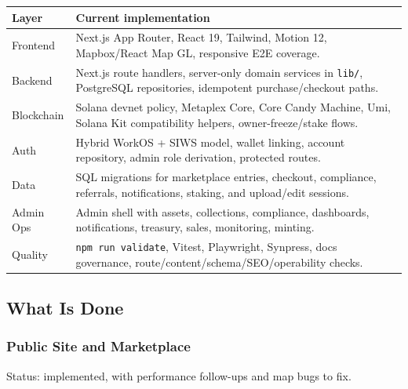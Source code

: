 \documentclass[
  10pt,
  letterpaper,
]{article}
\newcounter{none} %
\let\oldtexttt\texttt
\renewcommand{\texttt}[1]{\oldtexttt{\small #1}}
\begin{document}
{\def\LTcaptype{none} %
\begin{longtable}[]{@{}
  >{\raggedright\arraybackslash}p{}
  >{\raggedright\arraybackslash}p{}@{}}
\toprule\noalign{}
\begin{minipage}[b]{\linewidth}\raggedright
Layer
\end{minipage} & \begin{minipage}[b]{\linewidth}\raggedright
Current implementation
\end{minipage} \\
\midrule\noalign{}
\endhead
\bottomrule\noalign{}
\endlastfoot
Frontend & Next.js App Router, React 19, Tailwind, Motion 12,
Mapbox/React Map GL, responsive E2E coverage. \\
Backend & Next.js route handlers, server-only domain services in
\texttt{lib/}, PostgreSQL repositories, idempotent purchase/checkout
paths. \\
Blockchain & Solana devnet policy, Metaplex Core, Core Candy Machine,
Umi, Solana Kit compatibility helpers, owner-freeze/stake flows. \\
Auth & Hybrid WorkOS + SIWS model, wallet linking, account repository,
admin role derivation, protected routes. \\
Data & SQL migrations for marketplace entries, checkout, compliance,
referrals, notifications, staking, and upload/edit sessions. \\
Admin Ops & Admin shell with assets, collections, compliance,
dashboards, notifications, treasury, sales, monitoring, minting. \\
Quality & \texttt{npm\ run\ validate}, Vitest, Playwright, Synpress,
docs governance, route/content/schema/SEO/operability checks. \\
\end{longtable}
}

\subsection{What Is Done}\label{what-is-done}

\subsubsection{Public Site and
Marketplace}\label{public-site-and-marketplace}

Status: implemented, with performance follow-ups and map bugs to fix.
\end{document}

